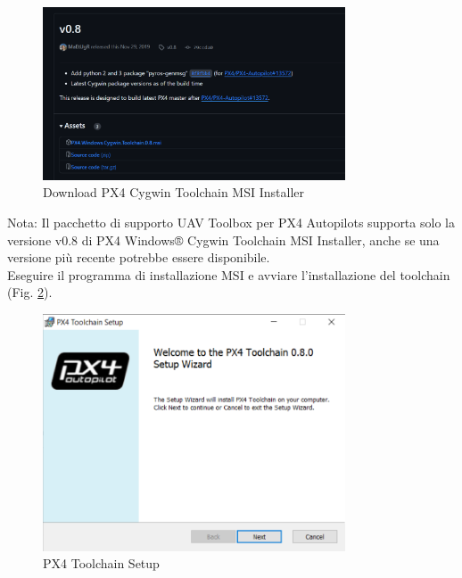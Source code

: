 \begin{figure}[H] %
  \centering
  \includegraphics[width=0.8\textwidth]{files/images/github_cywing.png} %
  \caption{Download PX4 Cygwin Toolchain MSI Installer} %
  \label{fig:Download PX4 Cygwin Toolchain MSI Installer} %
\end{figure}
\noindent
Nota: Il pacchetto di supporto UAV Toolbox per PX4 Autopilots supporta solo la versione v0.8 di PX4 Windows® Cygwin Toolchain MSI Installer, anche se una versione più recente potrebbe essere disponibile.
\\
Eseguire il programma di installazione MSI e avviare l'installazione del toolchain (Fig. \ref{fig:PX4 Toolchain Setup}).
\begin{figure}[H] %
  \centering
  \includegraphics[width=0.8\textwidth]{files/images/setup_toolchain.png} %
  \caption{PX4 Toolchain Setup} %
  \label{fig:PX4 Toolchain Setup} %
\end{figure}

